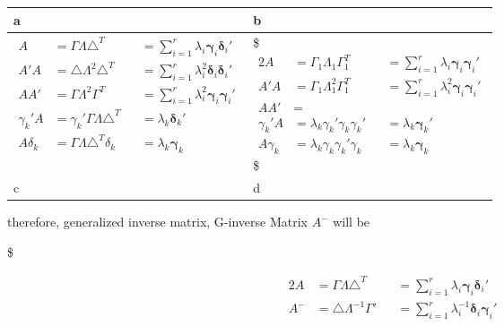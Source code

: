 \documentclass[
]{book}
\begin{document}
{{{\begin{longtable}[]{@{}
  >{\centering\arraybackslash}p{}
  >{\centering\arraybackslash}p{}@{}}
\toprule
a & b \\
\midrule
\endhead
\(\begin{alignat}{2} A &= \Gamma \Lambda \triangle^T &&=\sum_{i=1}^r \lambda_i \pmb \gamma_i \pmb \delta_i ' \\ A'A &= \triangle \Lambda^2 \triangle^T &&=\sum_{i=1}^r \lambda_i^2 \pmb \delta_i \pmb \delta_i ' \\ AA'&= \Gamma \Lambda^2 \Gamma^T &&=\sum_{i=1}^r \lambda_i^2 \pmb \gamma_i \pmb \gamma_i ' \\ \gamma_k ' A &= \gamma_k ' \Gamma \Lambda \triangle^T &&= \lambda_k \pmb \delta_k ' \\ A \delta_k &= \Gamma \Lambda \triangle^T \delta_k &&= \lambda_k \pmb \gamma_k \end{alignat}\) & \$\begin{alignat}{2} A &= \Gamma_1 \Lambda_1 \Gamma^T_1 &&=\sum_{i=1}^r \lambda_i \pmb \gamma_i \pmb \gamma_i ' \\ A'A &= \Gamma_1 \Lambda_1^2 \Gamma^T_1 &&=\sum_{i=1}^r \lambda_i^2 \pmb \gamma_i \pmb \gamma_i ' \\ AA'&=  && \\ \gamma_k ' A &=  \lambda_k \gamma_k ' \gamma_k \gamma_k '  &&= \lambda_k \pmb\gamma_k ' \\ A \gamma_k &=  \lambda_k \gamma_k \gamma_k ' \gamma_k  &&= \lambda_k \pmb \gamma_k \end{alignat} \$ \\
c & d \\
\bottomrule
\end{longtable}

therefore, generalized inverse matrix, G-inverse Matrix \(A^-\) will be

\$

\begin{alignat}{2}




A &= \Gamma \Lambda \triangle^T 

&&=\sum_{i=1}^r \lambda_i \pmb \gamma_i \pmb \delta_i '

\\


A^- &= \triangle 

 \Lambda^{-1}  \Gamma'

&&=\sum_{i=1}^r \lambda_i^{-1} \pmb \delta_i \pmb \gamma_i '




\end{alignat}}}}
\end{document}
